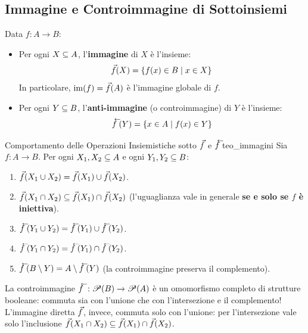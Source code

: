 \subsection{Immagine e Controimmagine di Sottoinsiemi}
Data $f: A \to B$:
\begin{itemize}
    \item Per ogni $X \subseteq A$, l'\textbf{immagine} di $X$ è l'insieme:
    \[
        \vec{f}(X) = \{f(x) \in B \mid x \in X\}
    \]
    In particolare, $\operatorname{im}(f) = \vec{f}(A)$ è l'immagine globale di $f$.
    \item Per ogni $Y \subseteq B$, l'\textbf{anti-immagine} (o controimmagine) di $Y$ è l'insieme:
    \[
        \antivecf(Y) = \{x \in A \mid f(x) \in Y\}
    \]
\end{itemize}

\begin{teorema}{Comportamento delle Operazioni Insiemistiche sotto $\vec{f}$ e $\antivecf$}{teo_immagini}
Sia $f: A \to B$. Per ogni $X_1, X_2 \subseteq A$ e ogni $Y_1, Y_2 \subseteq B$:
\begin{enumerate}
    \item $\vec{f}(X_1 \cup X_2) = \vec{f}(X_1) \cup \vec{f}(X_2)$.
    \item $\vec{f}(X_1 \cap X_2) \subseteq \vec{f}(X_1) \cap \vec{f}(X_2)$ (l'uguaglianza vale in generale \textbf{se e solo se $f$ è iniettiva}).
    \item $\antivecf(Y_1 \cup Y_2) = \antivecf(Y_1) \cup \antivecf(Y_2)$.
    \item $\antivecf(Y_1 \cap Y_2) = \antivecf(Y_1) \cap \antivecf(Y_2)$.
    \item $\antivecf(B \smin Y) = A \smin \antivecf(Y)$ (la controimmagine preserva il complemento).
\end{enumerate}
\end{teorema}

\begin{avvisoCutolo}
    La controimmagine $\antivecf: \P(B) \to \P(A)$ è un omomorfismo completo di strutture booleane: commuta sia con l'unione che con l'intersezione e il complemento!
    L'immagine diretta $\vec{f}$, invece, commuta solo con l'unione: per l'intersezione vale solo l'inclusione $\vec{f}(X_1 \cap X_2) \subseteq \vec{f}(X_1) \cap \vec{f}(X_2)$.
\end{avvisoCutolo}

